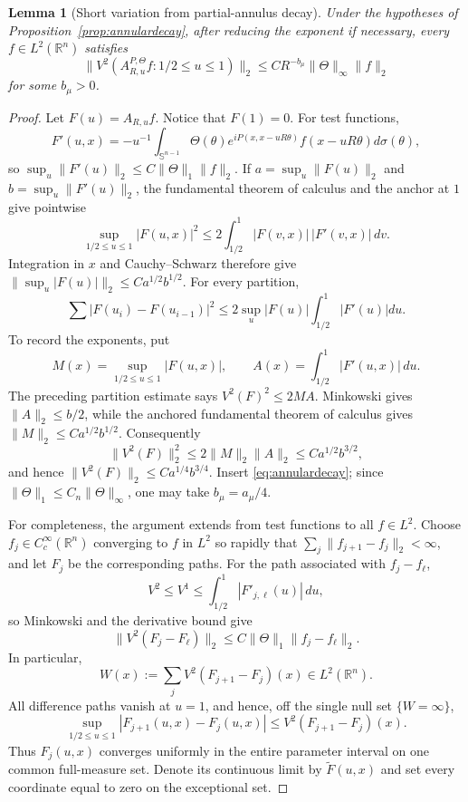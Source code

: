 \documentclass[11pt]{article}
\numberwithin{equation}{section}
\newtheorem{lemma}[theorem]{Lemma}
\theoremstyle{remark}
\theoremstyle{definition}
\newcommand{\R}{\mathbb R}
\newcommand{\Sph}{\mathbb S}
\newcommand{\norm}[1]{\lVert #1\rVert}
\begin{document}
\begin{lemma}[Short variation from partial-annulus decay]\label{lem:shortannular}
Under the hypotheses of Proposition~\ref{prop:annulardecay}, after reducing
the exponent if necessary, every $f\in L^2(\R^n)$ satisfies
\begin{equation}\label{eq:shortannular}
 \norm{V^2(A^{P,\Theta}_{R,u}f:1/2\le u\le1)}_2
 \le C R^{-b_\mu}\norm\Theta_\infty\norm f_2
\end{equation}
for some $b_\mu>0$.
\end{lemma}

\begin{proof}
Let $F(u)=A_{R,u}f$.  Notice that $F(1)=0$.  For test functions,
\[
 F'(u,x)=-u^{-1}\int_{\Sph^{n-1}}\Theta(\theta)
 e^{iP(x,x-uR\theta)}f(x-uR\theta)d\sigma(\theta),
\]
so $\sup_u\norm{F'(u)}_2\le C\norm\Theta_1\norm f_2$.  If
$a=\sup_u\norm{F(u)}_2$ and $b=\sup_u\norm{F'(u)}_2$, the fundamental
theorem of calculus and the anchor at $1$ give pointwise
\[
 \sup_{1/2\le u\le1}|F(u,x)|^2
 \le2\int_{1/2}^1|F(v,x)|\,|F'(v,x)|\,dv.
\]
Integration in $x$ and Cauchy--Schwarz therefore give
$\norm{\sup_u|F(u)|}_2\le C a^{1/2}b^{1/2}$.  For every partition,
\[
 \sum|F(u_i)-F(u_{i-1})|^2
 \le2\sup_u|F(u)|\int_{1/2}^1|F'(u)|du.
\]
To record the exponents, put
\[
 M(x)=\sup_{1/2\le u\le1}|F(u,x)|,
 \qquad A(x)=\int_{1/2}^1|F'(u,x)|\,du.
\]
The preceding partition estimate says $V^2(F)^2\le2MA$.
Minkowski gives $\norm A_2\le b/2$, while the anchored fundamental
theorem of calculus gives $\norm M_2\le Ca^{1/2}b^{1/2}$.  Consequently
\[
 \norm{V^2(F)}_2^2
 \le2\norm M_2\norm A_2
 \le Ca^{1/2}b^{3/2},
\]
and hence $\norm{V^2(F)}_2\le Ca^{1/4}b^{3/4}$.  Insert
\eqref{eq:annulardecay}; since $\norm\Theta_1\le C_n\norm\Theta_\infty$, one
may take $b_\mu=a_\mu/4$.

For completeness, the argument extends from test functions to all
$f\in L^2$.  Choose $f_j\in C_c^\infty(\R^n)$ converging to $f$ in $L^2$ so
rapidly that
$\sum_j\norm{f_{j+1}-f_j}_2<\infty$, and let $F_j$ be the corresponding
paths.  For the path associated with $f_j-f_\ell$,
\[
 V^2\le V^1\le\int_{1/2}^1|F'_{j,\ell}(u)|\,du,
\]
so Minkowski and the derivative bound give
\[
 \norm{V^2(F_j-F_\ell)}_2
 \le C\norm\Theta_1\norm{f_j-f_\ell}_2.
\]
In particular,
\[
 W(x):=\sum_jV^2(F_{j+1}-F_j)(x)\in L^2(\R^n).
\]
All difference paths vanish at $u=1$, and hence, off the single null set
$\{W=\infty\}$,
\[
 \sup_{1/2\le u\le1}|F_{j+1}(u,x)-F_j(u,x)|
 \le V^2(F_{j+1}-F_j)(x).
\]
Thus $F_j(u,x)$ converges uniformly in the entire parameter interval on
one common full-measure set.  Denote its continuous limit by
$\widetilde F(u,x)$ and set every coordinate equal to zero on the
exceptional set.


\end{proof}
\end{document}
